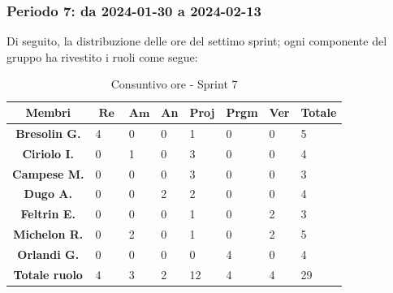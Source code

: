 \documentclass[10pt, a4paper]{article}
\begin{document}
{{{{{{{{{{{{{{{{{\subsubsection{Periodo 7: da 2024-01-30 a 2024-02-13}
Di seguito, la distribuzione delle ore del settimo sprint; ogni componente del gruppo ha rivestito i ruoli come segue:
\begin{table}[H]
    \begin{tabularx}{\textwidth}{c|X|X|X|X|X|X|X}
        \textbf{Membri} & $\operatorname{\textbf{Re}}$ & $\mathrm{\textbf{Am}}$ & \textbf{An} & \textbf{Proj} & \textbf{Prgm} & \textbf{Ver} & \textbf{Totale} \\
        \hline
        \textbf{Bresolin G.} & 4 & 0 & 0 & 1 & 0 & 0 & 5 \\
        \hline
        \textbf{Ciriolo I.}  & 0 & 1 & 0 & 3 & 0 & 0 & 4 \\
        \hline
        \textbf{Campese M.}  & 0 & 0 & 0 & 3 & 0 & 0 & 3 \\
        \hline
        \textbf{Dugo A.}     & 0 & 0 & 2 & 2 & 0 & 0 & 4 \\
        \hline
        \textbf{Feltrin E.}  & 0 & 0 & 0 & 1 & 0 & 2 & 3 \\
        \hline
        \textbf{Michelon R.} & 0 & 2 & 0 & 1 & 0 & 2 & 5 \\
        \hline
        \textbf{Orlandi G.}  & 0 & 0 & 0 & 0 & 4 & 0 & 4 \\
        \hline
        \textbf{Totale ruolo} & 4 & 3 & 2 & 12 & 4 & 4 & 29 \\
    \end{tabularx}
    \caption{Consuntivo ore - Sprint 7}
\end{table}

}}}}}}}}}}}}}}}}}
\end{document}
